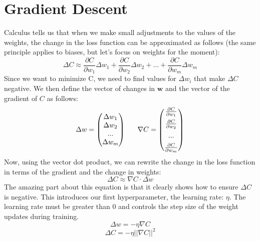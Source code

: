 \documentclass[../main]{subfiles}
\begin{document}
\section{Gradient Descent}
Calculus tells us that when we make small adjustments to the values of the weights, the change in the loss function can be approximated as follows (the same principle applies to biases, but let's focus on weights for the moment):
\begin{equation*}
    \Delta C \approx \frac{\partial C}{\partial w_1}\Delta w_1+ \frac{\partial C}{\partial w_2}\Delta w_2+...+\frac{\partial C}{\partial w_m}\Delta w_m
\end{equation*}
Since we want to minimize C, we need to find values for \(\Delta w_i\) that make \(\Delta C\) negative. We then define the vector of changes in \( \mathbf{w} \) and the vector of the gradient of \( C \) as follows:
\begin{equation*}
    \Delta w = \begin{pmatrix}
\Delta w_1 \\ 
\Delta w_2 \\ 
...       \\
\Delta w_m
\end{pmatrix} \ \ \quad \nabla C = \begin{pmatrix}
\frac{\partial C}{\partial w_1} \vspace{0.15cm}\\ 
\frac{\partial C}{\partial w_2} \vspace{0.15cm}\\ 
...       \vspace{0.15cm}\\
\frac{\partial C}{\partial w_m}
\end{pmatrix}
\end{equation*}
Now, using the vector dot product, we can rewrite the change in the loss function in terms of the gradient and the change in weights:
\begin{equation*}
    \Delta C \approx \nabla C\cdot\Delta w 
\end{equation*}
The amazing part about this equation is that it clearly shows how to ensure $\Delta C$ is negative. This introduces our first hyperparameter, the learning rate: $\eta$. The learning rate must be greater than 0 and controls the step size of the weight updates during training. 
\begin{equation*}
    \Delta w = -\eta \nabla C
\end{equation*}
\begin{equation*}
    \Delta C = -\eta ||\nabla C||^2
\end{equation*}
\end{document}
